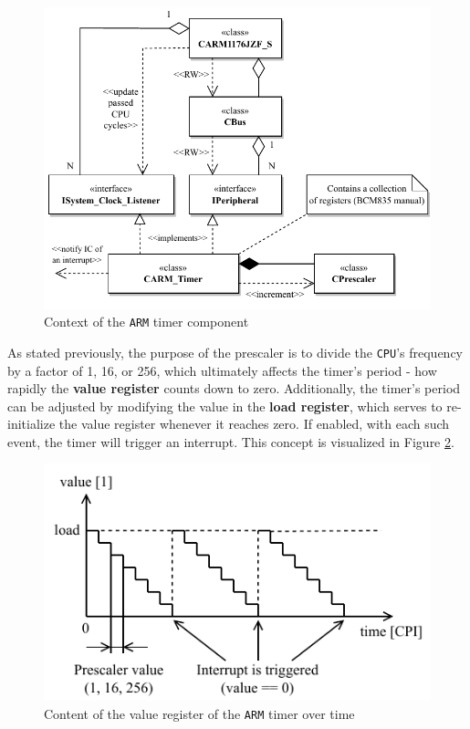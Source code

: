 \documentclass[english, ing, kiv, he, iso690numb, pdf]{fasthesis}
\begin{document}
	\begin{figure}[ht]
		\centering
		\includegraphics[width=1.0\textwidth]{img/diagrams/arm_timer.pdf}
		\caption{Context of the \texttt{ARM} timer component}
		\label{Context of the ARM timer component}
	\end{figure}
	
	As stated previously, the purpose of the prescaler is to divide the \texttt{CPU}'s frequency by a factor of 1, 16, or 256, which ultimately affects the timer's period - how rapidly the \textbf{value register} counts down to zero. Additionally, the timer's period can be adjusted by modifying the value in the \textbf{load register}, which serves to re-initialize the value register whenever it reaches zero. If enabled, with each such event, the timer will trigger an interrupt. This concept is visualized in Figure \ref{Content of the value register of the ARM timer over time}.
	
	\begin{figure}[ht]
		\centering
		\includegraphics[width=.8\textwidth]{img/diagrams/arm_timer_2.pdf}
		\caption{Content of the value register of the \texttt{ARM} timer over time}
		\label{Content of the value register of the ARM timer over time}
	\end{figure}
	
\end{document}
